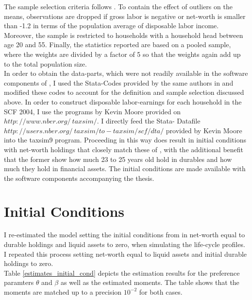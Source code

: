 \documentclass[a4paper,12pt,legno]{article}
\begin{document}
The sample selection criteria follows \cite{hintermaier2011}. To contain the effect of outliers on the means, observations are dropped if gross labor is negative or net-worth is smaller than -1.2 in terms of the population average of disposable labor income. Moreover, the sample is restricted to households with a household head between age 20 and 55. 
Finally, the statistics reported are based on a pooled sample, where the weights are divided by a factor of 5 so that the weights again add up to the total population size. \\
In order to obtain the data-parts, which were not readily available in the software components of \cite{hintermaier2011}, I used the Stata-Codes provided by the same authors in \cite{hintermaier2016} and modified these codes to account for the definition and sample selection discussed above. In order to construct disposable labor-earnings for each household in the SCF 2004, I use the programs by Kevin Moore provided on $http://www.nber.org/~taxsim/$.  I directly feed the Stata- Datafile $http://users.nber.org/~taxsim/to-taxsim/scf/dta/$ provided by Kevin Moore into the taxsim9 program. Proceeding in this way does result in initial conditions with net-worth holdings that closely match these of \cite{hintermaier2011}, with the additional benefit that the former show how much 23 to 25 years old hold in durables and how much they hold in financial assets. The initial conditions are made available with the software components accompanying the thesis.


\section{Initial Conditions}
\label{initial_conditions}

I re-estimated the model setting the initial conditions from \cite{hintermaier2011} in net-worth equal to durable holdings and liquid assets to zero, when simulating the life-cycle profiles. I repeated this process setting net-worth equal to liquid assets and initial durable holdings to zero.\\
Table \ref{estimates_initial_cond} depicts the estimation results for the preference paramters $\theta$ and $\beta$ as well as the estimated moments. The table shows that the moments are matched up to a precision $10^{-2}$ for both cases. 
\end{document}
